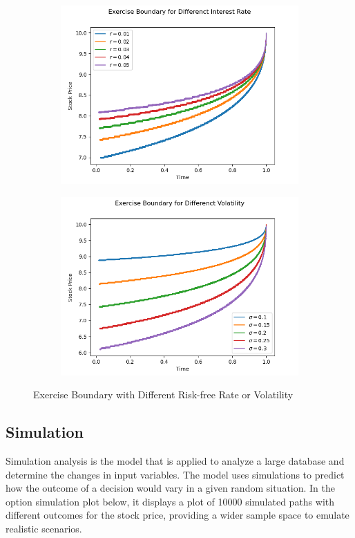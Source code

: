 \documentclass[12pt]{article}
\begin{document}
\begin{figure}[H]
  \centering
  \begin{subfigure}{.5\textwidth}
    \centering
    \includegraphics[width=\linewidth]{3a-iii-boundary-r.png}
  \end{subfigure}%
  \begin{subfigure}{.5\textwidth}
    \centering
    \includegraphics[width=\linewidth]{3a-iii-boundary-sigma.png}
  \end{subfigure}%
  \caption[]{Exercise Boundary with Different Risk-free Rate or Volatility}
\end{figure}

\subsection{Simulation}
Simulation analysis is the model that is applied to analyze a large database and determine the changes in input variables. The model uses simulations to predict how the outcome of a decision 
would vary in a given random situation. In the option simulation plot below, it displays a plot of 10000 simulated paths with different outcomes for the stock price, providing a wider sample 
space to emulate realistic scenarios.
\end{document}
